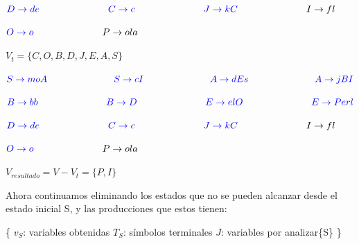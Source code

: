 $ \textcolor{blue}{ D \rightarrow de } \hspace{2.5cm} \textcolor{blue}{ C \rightarrow c} \hspace{2.5cm} \textcolor{blue}{ J \rightarrow  kC } \hspace{2.5cm} I \rightarrow  fl$ \newline

$ \textcolor{blue}{ O \rightarrow o } \hspace{2.5cm} P \rightarrow ola$ \newline \newline

$ V_{t} = \{ C,O,B,D,J,E,A,S \} $ \newline

$ \textcolor{blue}{ S \rightarrow moA } \hspace{2.5cm} \textcolor{blue}{ S \rightarrow cI } \hspace{2.5cm} \textcolor{blue}{ A \rightarrow  dEs } \hspace{2.5cm} \textcolor{blue}{ A \rightarrow  jBI }$ \newline

$ \textcolor{blue}{ B \rightarrow bb } \hspace{2.5cm} \textcolor{blue}{ B \rightarrow D } \hspace{2.5cm} \textcolor{blue}{ E \rightarrow  elO } \hspace{2.5cm} \textcolor{blue}{ E \rightarrow  Perl} $ \newline

$ \textcolor{blue}{ D \rightarrow de } \hspace{2.5cm} \textcolor{blue}{ C \rightarrow c} \hspace{2.5cm} \textcolor{blue}{ J \rightarrow  kC } \hspace{2.5cm} I \rightarrow  fl$ \newline

$ \textcolor{blue}{ O \rightarrow o } \hspace{2.5cm} P \rightarrow ola$ \newline \newline

$ V_{resultado} = V - V_{t} = \{ P,I \} $ \newline

Ahora continuamos eliminando los estados que no se pueden alcanzar desde el estado inicial S, y las producciones que estos tienen: \newline

\{ $ v_{S} $: variables obtenidas \hspace{0.5cm} $ T_{S} $: símbolos terminales \hspace{0.5cm} $ J $: variables por analizar\{S\} \} \newline \newline

